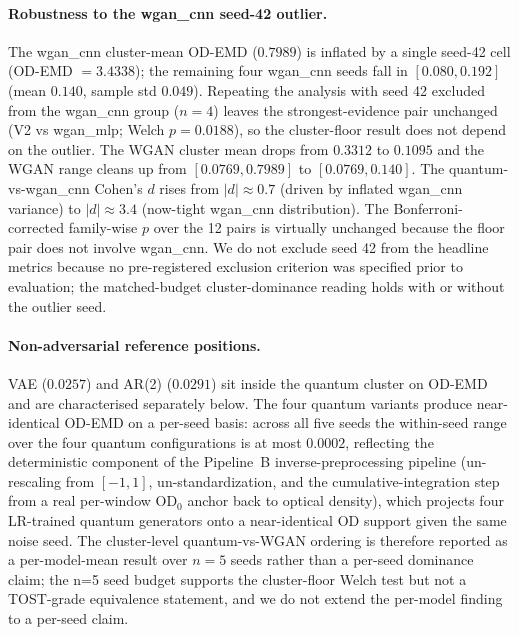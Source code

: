 \documentclass[12pt,twocolumn]{article}
\begin{document}
\paragraph{Robustness to the wgan\_cnn seed-42 outlier.}
The wgan\_cnn cluster-mean OD-EMD ($0.7989$) is inflated by a single
seed-42 cell (OD-EMD $= 3.4338$); the remaining four wgan\_cnn seeds
fall in $[0.080, 0.192]$ (mean $0.140$, sample std $0.049$). Repeating
the analysis with seed 42 excluded from the wgan\_cnn group ($n=4$)
leaves the strongest-evidence pair unchanged (V2 vs wgan\_mlp;
Welch $p = 0.0188$), so the cluster-floor result does not depend on
the outlier. The WGAN cluster mean drops from $0.3312$ to $0.1095$ and
the WGAN range cleans up from $[0.0769, 0.7989]$ to $[0.0769, 0.140]$.
The quantum-vs-wgan\_cnn Cohen's $d$ rises from $|d| \approx 0.7$
(driven by inflated wgan\_cnn variance) to $|d| \approx 3.4$
(now-tight wgan\_cnn distribution). The Bonferroni-corrected
family-wise $p$ over the 12 pairs is virtually unchanged because the
floor pair does not involve wgan\_cnn. We do not exclude seed 42 from
the headline metrics because no pre-registered exclusion criterion was
specified prior to evaluation; the matched-budget cluster-dominance
reading holds with or without the outlier seed.

\paragraph{Non-adversarial reference positions.}
VAE ($0.0257$) and AR(2) ($0.0291$) sit
inside the quantum cluster on OD-EMD and are characterised separately
below. The four quantum variants produce near-identical OD-EMD on a
per-seed basis: across all five seeds the within-seed range over the
four quantum configurations is at most $0.0002$, reflecting the
deterministic component of the Pipeline~B inverse-preprocessing
pipeline (un-rescaling from $[-1, 1]$, un-standardization, and the
cumulative-integration step from a real per-window OD$_0$ anchor back
to optical density), which projects four LR-trained quantum
generators onto a near-identical OD support given the same noise
seed. The cluster-level quantum-vs-WGAN ordering is therefore reported
as a per-model-mean result over $n=5$ seeds rather than a per-seed
dominance claim; the n=5 seed budget supports the cluster-floor Welch
test but not a TOST-grade equivalence statement, and we do not extend
the per-model finding to a per-seed claim.
\end{document}
